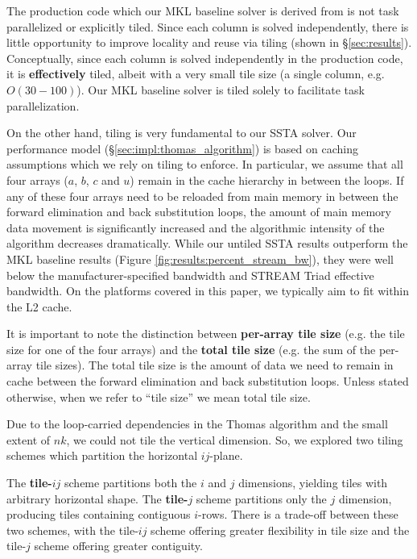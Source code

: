 \documentclass[10pt, conference, compsocconf]{IEEEtran}
\begin{document}
The production code which our MKL baseline solver is derived from is not task
  parallelized or explicitly tiled.
Since each column is solved independently, there is little opportunity to improve
  locality and reuse via tiling (shown in \S\ref{sec:results}).
Conceptually, since each column is solved independently in the production code,
  it is \textbf{effectively} tiled, albeit with a very small tile size (a single
  column, e.g. \(O(30-100)\)).
Our MKL baseline solver is tiled solely to facilitate task parallelization.

On the other hand, tiling is very fundamental to our SSTA solver.
Our performance model (\S\ref{sec:impl:thomas_algorithm})
  is based on caching assumptions which we rely on tiling to enforce.
In particular, we assume that all four arrays (\(a\), \(b\), \(c\) and \(u\))
  remain in the cache hierarchy in between the loops. 
If any of these four arrays need to be reloaded from main memory in between the
  forward elimination and back substitution loops, the amount of main memory data
  movement is significantly increased and the algorithmic intensity of the
  algorithm decreases dramatically.
While our untiled SSTA results outperform the MKL baseline results (Figure
  \ref{fig:results:percent_stream_bw}), they were well below the manufacturer-specified
  bandwidth and STREAM Triad effective bandwidth.
On the platforms covered in this paper, we typically aim to fit within the L2
  cache.

It is important to note the distinction between \textbf{per-array tile size}
  (e.g. the tile size for one of the four arrays) and the
  \textbf{total tile size} (e.g. the sum of the per-array tile sizes).
The total tile size is the amount of data we need to remain in cache between
  the forward elimination and back substitution loops.
Unless stated otherwise, when we refer to ``tile size'' we mean
  total tile size.

Due to the loop-carried dependencies in the Thomas algorithm and the small
  extent of \(nk\), we could not tile the vertical dimension. So, we explored two
  tiling schemes which partition the horizontal \(ij\)-plane.

The \textbf{tile-\(ij\)} scheme partitions both the \(i\) and \(j\) dimensions,
  yielding tiles with arbitrary horizontal shape. 
The \textbf{tile-\(j\)} scheme partitions only the \(j\) dimension, producing
  tiles containing contiguous \(i\)-rows.
There is a trade-off between these two schemes, with the tile-\(ij\) scheme
  offering greater flexibility in tile size and the tile-\(j\) scheme offering
  greater contiguity. 
\end{document}
